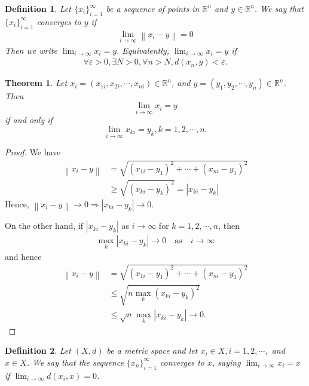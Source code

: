 \documentclass[12pt,leqno]{amsart}
\newtheorem{definition}{Definition}[section]
\newtheorem{theorem}{Theorem}[section]
\theoremstyle{definition}
\numberwithin{equation}{subsection}
\begin{document}
\medskip

\begin{definition}
Let $\{x_i\}^\infty_{i=1}$ be a sequence of points in $\mathbb{R}^n$ and $y\in\mathbb{R}^n$. We say that $\{x_i\}^\infty_{i=1}$ converges to $y$ if 
\begin{align*}
    \lim_{i\to\infty}\left\|x_i - y \right\| = 0
\end{align*}
Then we write $\lim_{i\to\infty}x_i = y$. Equivalently, $\lim_{i\to\infty}x_i = y$ if \begin{align*}
    \forall \varepsilon > 0, \exists N > 0, \forall n > N, d(x_n, y) < \varepsilon.
\end{align*}
\end{definition}

\medskip

\begin{theorem}
Let $x_i = (x_{1i}, x_{2i}, \cdots, x_{ni}) \in \mathbb{R}^n$, and $y = (y_{1}, y_{2}, \cdots, y_{n}) \in \mathbb{R}^n$. Then 
$$\lim_{i\to\infty}x_i = y$$ if and only if $$\lim_{i\to\infty}x_{ki} = y_k,k = 1,2,\cdots,n.$$
\end{theorem}
\begin{proof}
We have 
\begin{align*}
    \left\|x_i - y\right\| & = \sqrt{(x_{1i}-y_1)^2 + \cdots + (x_{ni}-y_1)^2} \\
    & \geq \sqrt{(x_{ki}-y_k)^2} = |x_{ki} - y_k|
\end{align*}
Hence, $\left\|x_i - y\right\| \to 0 \Rightarrow |x_{ki} - y_k| \to 0$.

On the other hand, if $|x_{ki} - y_k|$ as $i\to\infty$ for $k = 1,2,\cdots, n$, then
\begin{align*}
    \max_k |x_{ki} - y_k| \to 0 \quad \text{as}\quad i\to\infty
\end{align*}
and hence
\begin{align*}
    \left\|x_i - y\right\| & = \sqrt{(x_{1i}-y_1)^2 + \cdots + (x_{ni}-y_1)^2} \\
    & \leq \sqrt{n \max_k (x_{ki}-y_k)^2} \\
    & \leq \sqrt{n} \max_k |x_{ki} - y_k| \to 0.
\end{align*}
\end{proof}

\medskip

\begin{definition}
Let $(X,d)$ be a metric space and let $x_i\in X, i = 1,2,\cdots,$ and $x\in X$. We say that the sequence $\{x_n\}^\infty_{i=1}$ converges to $x$, saying
$\lim_{i\to\infty}x_i = x$ if $\lim_{i\to\infty}d(x_i, x) = 0$.
\end{definition}
\end{document}
